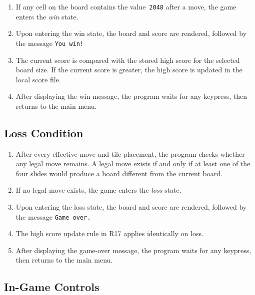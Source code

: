 \documentclass{article} %
\begin{document}
\begin{enumerate}[resume]

	\item If any cell on the board contains the value~\texttt{2048} after a move, the game
	      enters the \emph{win} state.

	\item Upon entering the win state, the board and score are rendered, followed by the message
	      \texttt{You win!}

	\item The current score is compared with the stored high score for the selected board size.
	      If the current score is greater, the high score is updated in the local score file.

	\item After displaying the win message, the program waits for any keypress,
	      then returns to the main menu.

\end{enumerate}

\subsection{Loss Condition}

\begin{enumerate}[resume]

	\item After every effective move and tile placement, the program checks whether any legal
	      move remains.
	      A legal move exists if and only if at least one of the four slides would produce a board
	      different from the current board.

	\item If no legal move exists, the game enters the \emph{loss} state.

	\item Upon entering the loss state, the board and score are rendered, followed by the message
	      \texttt{Game over.}

	\item The high score update rule in R17 applies identically on loss.

	\item After displaying the game-over message, the program waits for any keypress,
	      then returns to the main menu.

\end{enumerate}

\subsection{In-Game Controls}
\end{document}

